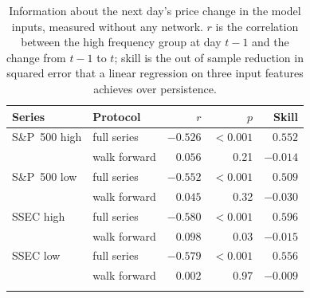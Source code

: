 \begin{table}[ht]
\caption{Information about the next day's price change in the model inputs, measured without any network. $r$ is the correlation between the high frequency group at day $t-1$ and the change from $t-1$ to $t$; skill is the out of sample reduction in squared error that a linear regression on three input features achieves over persistence.}
\label{tab:diagnostic}
\centering
\begin{tabular}{@{}llrrr@{}}
\toprule
Series & Protocol & $r$ & $p$ & Skill \\
\midrule
S\&P~500 high & full series & ${-}0.526$ & $<0.001$ & $0.552$ \\
 & walk forward & $0.056$ & 0.21 & ${-}0.014$ \\
S\&P~500 low & full series & ${-}0.552$ & $<0.001$ & $0.509$ \\
 & walk forward & $0.045$ & 0.32 & ${-}0.030$ \\
SSEC high & full series & ${-}0.580$ & $<0.001$ & $0.596$ \\
 & walk forward & $0.098$ & 0.03 & ${-}0.015$ \\
SSEC low & full series & ${-}0.579$ & $<0.001$ & $0.556$ \\
 & walk forward & $0.002$ & 0.97 & ${-}0.009$ \\
\botrule
\end{tabular}
\end{table}
